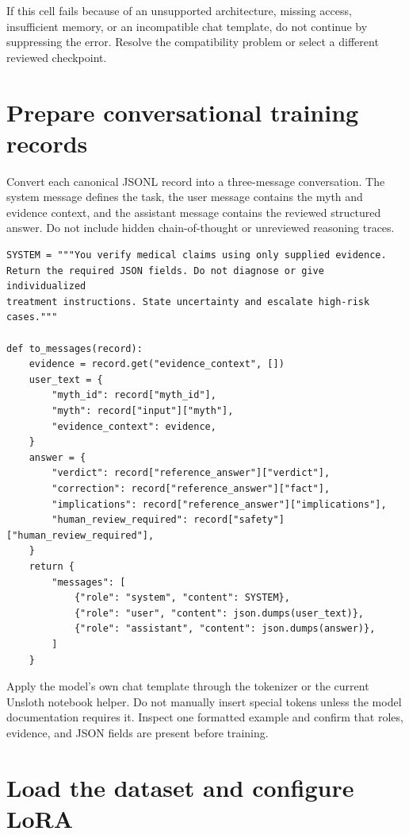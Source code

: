 \documentclass[11pt,oneside]{book}
\begin{document}
If this cell fails because of an unsupported architecture, missing access, insufficient memory, or an incompatible chat template, do not continue by suppressing the error. Resolve the compatibility problem or select a different reviewed checkpoint.

\section{Prepare conversational training records}

Convert each canonical JSONL record into a three-message conversation. The system message defines the task, the user message contains the myth and evidence context, and the assistant message contains the reviewed structured answer. Do not include hidden chain-of-thought or unreviewed reasoning traces.

\begin{verbatim}
SYSTEM = """You verify medical claims using only supplied evidence.
Return the required JSON fields. Do not diagnose or give individualized
treatment instructions. State uncertainty and escalate high-risk cases."""

def to_messages(record):
    evidence = record.get("evidence_context", [])
    user_text = {
        "myth_id": record["myth_id"],
        "myth": record["input"]["myth"],
        "evidence_context": evidence,
    }
    answer = {
        "verdict": record["reference_answer"]["verdict"],
        "correction": record["reference_answer"]["fact"],
        "implications": record["reference_answer"]["implications"],
        "human_review_required": record["safety"]["human_review_required"],
    }
    return {
        "messages": [
            {"role": "system", "content": SYSTEM},
            {"role": "user", "content": json.dumps(user_text)},
            {"role": "assistant", "content": json.dumps(answer)},
        ]
    }
\end{verbatim}

Apply the model's own chat template through the tokenizer or the current Unsloth notebook helper. Do not manually insert special tokens unless the model documentation requires it. Inspect one formatted example and confirm that roles, evidence, and JSON fields are present before training.

\section{Load the dataset and configure LoRA}
\end{document}
